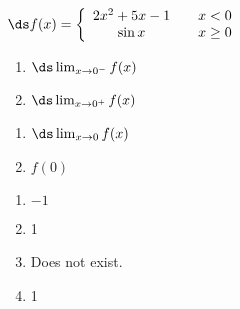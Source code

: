 {$\ds f(x) = \left\{\begin{array}{ccc}
	2x^2+5x-1 & & x<0 \\
	\sin x & & x\geq 0
	\end{array}
	\right.
$

\noindent\begin{minipage}[t]{.49\linewidth}
\begin{enumerate}
\item		$\ds \lim_{x\to 0^-} f(x)$
\item		$\ds \lim_{x\to 0^+} f(x)$
\end{enumerate}
\end{minipage}
\noindent\begin{minipage}[t]{.49\linewidth}
\begin{enumerate}\addtocounter{enumii}{2}
\item		$\ds \lim_{x\to 0} f(x)$
\item		$f(0)$\end{enumerate}
\end{minipage}
}
{\begin{enumerate}
\item		$-1$
\item		1
\item		Does not exist.
\item		1
\end{enumerate}
}


